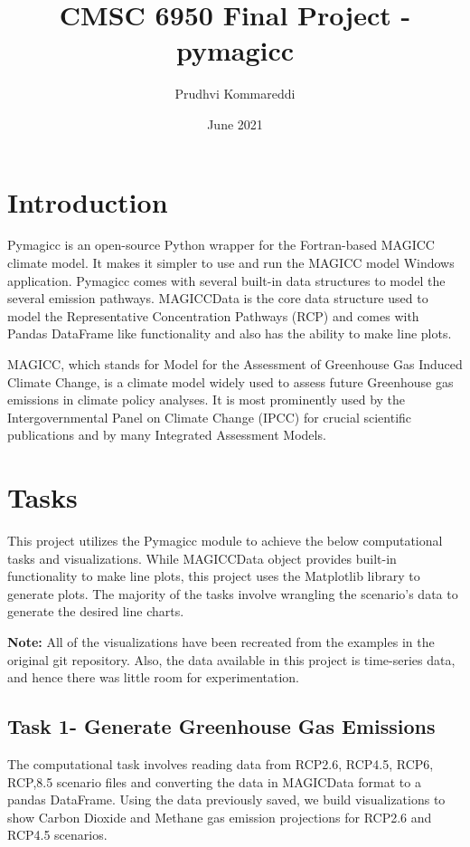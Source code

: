 \documentclass{article}
\title{CMSC 6950 Final Project - pymagicc}
\author{Prudhvi Kommareddi}
\date{June 2021}
\begin{document}
\maketitle

\section{Introduction}
Pymagicc\cite{Gieseke2018} is an open-source Python wrapper for the Fortran-based MAGICC climate model.
It makes it simpler to use and run the MAGICC model Windows application. Pymagicc comes with several
built-in data structures to model the several emission pathways. MAGICCData is the core data structure 
used to model the Representative Concentration Pathways (RCP) and comes with Pandas DataFrame like
functionality and also has the ability to make line plots.

MAGICC, which stands for Model for the Assessment of Greenhouse Gas Induced Climate Change, is a
climate model widely used to assess future Greenhouse gas emissions in climate policy analyses.
It is most prominently used by the Intergovernmental Panel on Climate Change (IPCC) for crucial scientific
publications and by many Integrated Assessment Models.


\section{Tasks}
This project utilizes the Pymagicc module to achieve the below computational tasks and visualizations.
While MAGICCData object provides built-in functionality to make line plots, this project uses the
Matplotlib library to generate plots. The majority of the tasks involve wrangling the scenario's data
to generate the desired line charts.

\textbf{Note:} All of the visualizations have been recreated from the examples in the
original git repository. Also, the data available in this project is time-series data,
and hence there was little room for experimentation.

\subsection{Task 1- Generate Greenhouse Gas Emissions}
The computational task involves reading data from RCP2.6, RCP4.5, RCP6, RCP,8.5 scenario files
and converting the data in MAGICData format to a pandas DataFrame. Using the data previously saved, we
build visualizations to show Carbon Dioxide and Methane gas emission projections for RCP2.6 and RCP4.5 scenarios.
\end{document}
